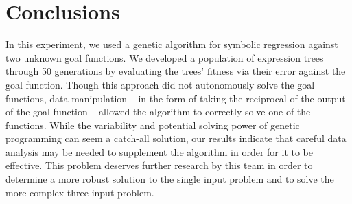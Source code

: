 
\section{Conclusions}
\label{sec:concl}

In this experiment, we used a genetic algorithm for symbolic regression against two unknown goal functions.  We developed a population of expression trees through 50 generations by evaluating the trees' fitness via their error against the goal function.  Though this approach did not autonomously solve the goal functions, data manipulation -- in the form of taking the reciprocal of the output of the goal function -- allowed the algorithm to correctly solve one of the functions.  While the variability and potential solving power of genetic programming can seem a catch-all solution, our results indicate that careful data analysis may be needed to supplement the algorithm in order for it to be effective.  This problem deserves further research by this team in order to determine a more robust solution to the single input problem and to solve the more complex three input problem.
